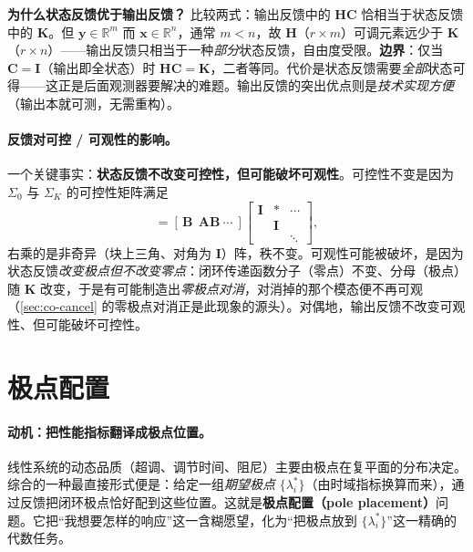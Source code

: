 \begin{insight}
\textbf{为什么状态反馈优于输出反馈？}\;
比较两式：输出反馈中的 $\mathbf H\mathbf C$ 恰相当于状态反馈中的 $\mathbf K$。但 $\mathbf y\in\mathbb R^m$ 而 $\mathbf x\in\mathbb R^n$，通常 $m<n$，故 $\mathbf H$（$r\times m$）可调元素远少于 $\mathbf K$（$r\times n$）——输出反馈只相当于一种\emph{部分}状态反馈，自由度受限。\textbf{边界}：仅当 $\mathbf C=\mathbf I$（输出即全状态）时 $\mathbf H\mathbf C=\mathbf K$，二者等同。代价是状态反馈需要\emph{全部}状态可得——这正是后面观测器要解决的难题。输出反馈的突出优点则是\emph{技术实现方便}（输出本就可测，无需重构）。
\end{insight}

\paragraph{反馈对可控 / 可观性的影响。}
一个关键事实：\textbf{状态反馈不改变可控性，但可能破坏可观性}\cite{liubao2006modern,zhang2017modern}。可控性不变是因为 $\Sigma_0$ 与 $\Sigma_K$ 的可控性矩阵满足
\begin{equation}
  [\,\mathbf B\ \ (\mathbf A-\mathbf B\mathbf K)\mathbf B\ \cdots\ ]=[\,\mathbf B\ \ \mathbf A\mathbf B\ \cdots\ ]\begin{bmatrix}\mathbf I&*&\cdots\\&\mathbf I&\\&&\ddots\end{bmatrix},
  \label{eq:syn-ctrb-invariant}
\end{equation}
右乘的是非奇异（块上三角、对角为 $\mathbf I$）阵，秩不变。可观性可能被破坏，是因为状态反馈\emph{改变极点但不改变零点}：闭环传递函数分子（零点）不变、分母（极点）随 $\mathbf K$ 改变，于是有可能制造出\emph{零极点对消}，对消掉的那个模态便不再可观（\cref{sec:co-cancel} 的零极点对消正是此现象的源头）。对偶地，输出反馈不改变可观性、但可能破坏可控性。

\section{极点配置}
\label{sec:syn-pole}

\paragraph{动机：把性能指标翻译成极点位置。}
线性系统的动态品质（超调、调节时间、阻尼）主要由极点在复平面的分布决定。综合的一种最直接形式便是：给定一组\emph{期望极点} $\{\lambda_i^*\}$（由时域指标换算而来），通过反馈把闭环极点恰好配到这些位置。这就是\textbf{极点配置（pole placement）}问题。它把“我想要怎样的响应”这一含糊愿望，化为“把极点放到 $\{\lambda_i^*\}$”这一精确的代数任务。

